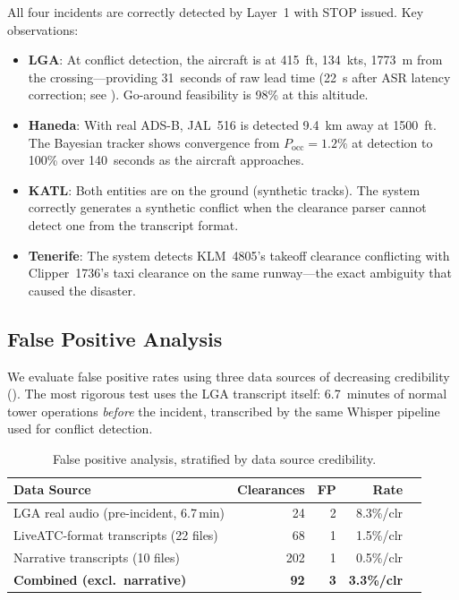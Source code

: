 \documentclass[11pt,a4paper]{article}
\begin{document}
All four incidents are correctly detected by Layer~1 with STOP issued.
Key observations:
\begin{itemize}[nosep]
    \item \textbf{LGA}: At conflict detection, the aircraft is at 415~ft, 134~kts, 1773~m from the crossing---providing 31~seconds of raw lead time (22~s after ASR latency correction; see ). Go-around feasibility is 98\% at this altitude.
    \item \textbf{Haneda}: With real ADS-B, JAL~516 is detected 9.4~km away at 1500~ft. The Bayesian tracker shows convergence from $P_{\mathrm{occ}} = 1.2\%$ at detection to 100\% over 140~seconds as the aircraft approaches.
    \item \textbf{KATL}: Both entities are on the ground (synthetic tracks). The system correctly generates a synthetic conflict when the clearance parser cannot detect one from the transcript format.
    \item \textbf{Tenerife}: The system detects KLM~4805's takeoff clearance conflicting with Clipper~1736's taxi clearance on the same runway---the exact ambiguity that caused the disaster.
\end{itemize}

\subsection{False Positive Analysis}

We evaluate false positive rates using three data sources of decreasing credibility ().
The most rigorous test uses the LGA transcript itself: 6.7~minutes of normal tower operations \emph{before} the incident, transcribed by the same Whisper pipeline used for conflict detection.

\begin{table}[ht]
\centering
\caption{False positive analysis, stratified by data source credibility.}
\label{tab:fp}
\small
\begin{tabular}{@{}lrrrr@{}}
\toprule
\textbf{Data Source} & \textbf{Clearances} & \textbf{FP} & \textbf{Rate} \\
\midrule
LGA real audio (pre-incident, 6.7\,min) & 24 & 2 & 8.3\%/clr \\
LiveATC-format transcripts (22 files)    & 68 & 1 & 1.5\%/clr \\
Narrative transcripts (10 files)         & 202 & 1 & 0.5\%/clr \\
\midrule
\textbf{Combined (excl.\ narrative)} & \textbf{92} & \textbf{3} & \textbf{3.3\%/clr} \\
\bottomrule
\end{tabular}
\end{table}
\end{document}

